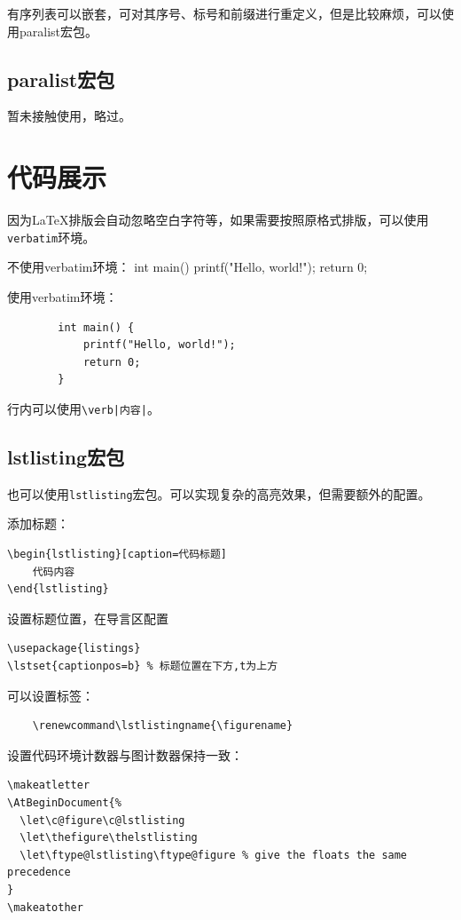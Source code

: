 有序列表可以嵌套，可对其序号、标号和前缀进行重定义，但是比较麻烦，可以使用paralist宏包。


\subsection{paralist宏包}\label{subsec:paralist}

暂未接触使用，略过。

\section{代码展示}\label{sec:codeshow}

因为\LaTeX{}排版会自动忽略空白字符等，如果需要按照原格式排版，可以使用\lstinline{verbatim}环境。


\begin{codeshow}
    不使用verbatim环境：
    int main() {
            printf("Hello, world!");
            return 0;
        }

    使用verbatim环境：
    \begin{verbatim}
        int main() {
            printf("Hello, world!");
            return 0;
        }
    \end{verbatim}
\end{codeshow}

行内可以使用\lstinline{\verb|内容|}。

\subsection{lstlisting宏包}\label{subsec:lstlistings}

也可以使用\lstinline{lstlisting}宏包。可以实现复杂的高亮效果，但需要额外的配置。

添加标题：
\begin{verbatim}
\begin{lstlisting}[caption=代码标题]
    代码内容
\end{lstlisting}
\end{verbatim}

设置标题位置，在导言区配置
\begin{lstlisting}
\usepackage{listings}
\lstset{captionpos=b} % 标题位置在下方,t为上方
\end{lstlisting}

可以设置标签：
\begin{lstlisting}
    \renewcommand\lstlistingname{\figurename}
\end{lstlisting}

设置代码环境计数器与图计数器保持一致：
\begin{lstlisting}
\makeatletter
\AtBeginDocument{%
  \let\c@figure\c@lstlisting
  \let\thefigure\thelstlisting
  \let\ftype@lstlisting\ftype@figure % give the floats the same precedence
}
\makeatother
\end{lstlisting}